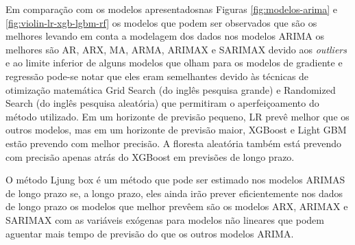 Em comparação com os modelos apresentadosnas Figuras \ref{fig:modelos-arima} e \ref{fig:violin-lr-xgb-lgbm-rf} os modelos que podem ser observados que são os melhores levando em conta a modelagem dos dados nos modelos ARIMA os melhores são AR, ARX, MA, ARMA, ARIMAX e SARIMAX devido aos \textit{outliers} e ao limite inferior de alguns modelos que olham para os modelos de gradiente e regressão pode-se notar que eles eram semelhantes devido às técnicas de otimização matemática Grid Search (do inglês pesquisa grande) e Randomized Search (do inglês pesquisa aleatória) que permitiram o aperfeiçoamento do método utilizado. Em um horizonte de previsão pequeno, LR prevê melhor que os outros modelos, mas em um horizonte de previsão maior, XGBoost e Light GBM estão prevendo com melhor precisão. A floresta aleatória também está prevendo com precisão apenas atrás do XGBoost em previsões de longo prazo.

O método Ljung box é um método que pode ser estimado nos modelos ARIMAS de longo prazo se, a longo prazo, eles ainda irão prever eficientemente nos dados de longo prazo os modelos que melhor prevêem são os modelos ARX, ARIMAX e SARIMAX com as variáveis exógenas para modelos não lineares que podem aguentar mais tempo de previsão do que os outros modelos ARIMA.  


 
  
    

    
